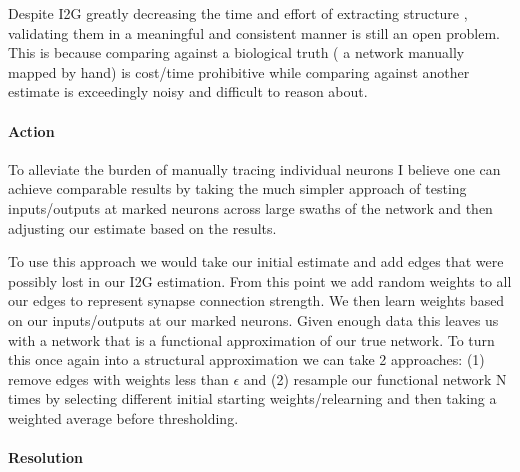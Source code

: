 \documentclass[12pt]{article}
\newcommand{\todo}[1]{{\color{red}{\it TODO: #1}}}
\begin{document}
Despite I2G greatly decreasing the time and effort of extracting structure , validating them in a meaningful and consistent manner is still an open problem. This is because comparing against a biological truth ( a network manually mapped by hand) is cost/time prohibitive while comparing against another estimate is exceedingly noisy and difficult to reason about. 


\paragraph{Action}

To alleviate the burden of manually tracing individual neurons I believe one can achieve comparable results by taking the much simpler approach of testing inputs/outputs at marked neurons across large swaths of the network and then adjusting our estimate based on the results. 

To use this approach we would take our initial estimate and add edges that were possibly lost in our I2G estimation. From this point we add random weights to all our edges to represent synapse connection strength. We then learn weights based on our inputs/outputs at our marked neurons. Given enough data this leaves us with a network that is a functional approximation of our true network.  To turn this once again into a structural approximation we can take 2 approaches: (1) remove edges with weights less than $\epsilon$ and (2) resample our functional network N times by selecting different initial starting weights/relearning and then taking a weighted average before thresholding. 


\paragraph{Resolution}
\end{document}
